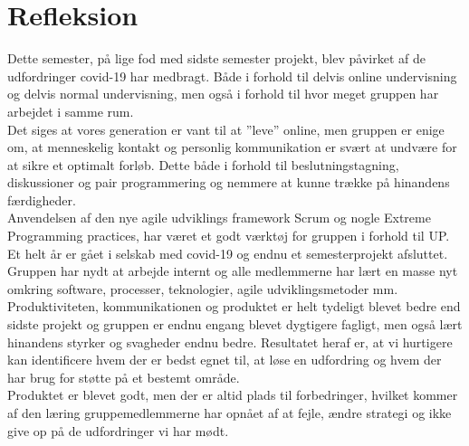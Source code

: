 \chapter{Refleksion}\label{ch:refleksion}
Dette semester, på lige fod med sidste semester projekt, blev påvirket af de udfordringer covid-19 har medbragt.
Både i forhold til delvis online undervisning og delvis normal undervisning, 
men også i forhold til hvor meget gruppen har arbejdet i samme rum. \\

Det siges at vores generation er vant til at ”leve” online, men gruppen er enige om, 
at menneskelig kontakt og personlig kommunikation er svært at undvære for at sikre et optimalt forløb. 
Dette både i forhold til beslutningstagning, diskussioner og pair programmering og 
nemmere at kunne trække på hinandens færdigheder. \\

Anvendelsen af den nye agile udviklings framework Scrum og nogle Extreme Programming practices, 
har været et godt værktøj for gruppen i forhold til UP. \\

Et helt år er gået i selskab med covid-19 og endnu et semesterprojekt afsluttet. 
Gruppen har nydt at arbejde internt og alle medlemmerne har lært en masse nyt 
omkring software, processer, teknologier, agile udviklingsmetoder mm. \\

Produktiviteten, kommunikationen og produktet er helt tydeligt blevet bedre end sidste 
projekt og gruppen er endnu engang blevet dygtigere fagligt, 
men også lært hinandens styrker og svagheder endnu bedre. Resultatet heraf er, 
at vi hurtigere kan identificere hvem der er bedst egnet til, 
at løse en udfordring og hvem der har brug for støtte på et bestemt område. \\

Produktet er blevet godt, men der er altid plads til forbedringer, 
hvilket kommer af den læring gruppemedlemmerne har opnået af at fejle, 
ændre strategi og ikke give op på de udfordringer vi har mødt.
